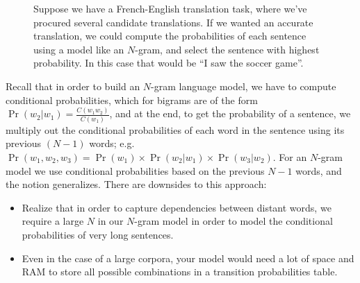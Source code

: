 \documentclass[12pt]{article}
\begin{document}
\begin{figure}[h]
  \begin{center}
    \caption{Suppose we have a French-English translation task, where we've procured several candidate translations. If we wanted an accurate translation, we could compute the probabilities of each sentence using a model like an $N$-gram, and select the sentence with highest probability. In this case that would be ``I saw the soccer game''.}
  \end{center}
\end{figure}

Recall that in order to build an $N$-gram language model, we have to compute conditional probabilities, which for bigrams are of the form $\Pr(w_2 | w_1) = \frac{C(w_1 w_2)}{C(w_1)}$, and at the end, to get the probability of a sentence, we multiply out the conditional probabilities of each word in the sentence using its previous $(N-1)$ words; e.g. $\Pr(w_1, w_2, w_3) = \Pr(w_1) \times \Pr(w_2 | w_1) \times \Pr(w_3 | w_2)$. For an $N$-gram model we use conditional probabilities based on the previous $N-1$ words, and the notion generalizes. There are downsides to this approach:

\begin{itemize}
  \item Realize that in order to capture dependencies between distant words, we require a large $N$ in our $N$-gram model in order to model the conditional probabilities of very long sentences.
\item Even in the case of a large corpora, your model would need a lot of space and RAM to store all possible combinations in a transition probabilities table.
\end{itemize}
\end{document}
